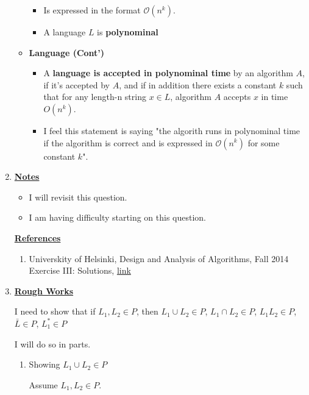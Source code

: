 \documentclass[12pt]{article}
\begin{document}
\begin{enumerate}[1.]
\begin{itemize}
        \begin{itemize}
            \item Is expressed in the format $\mathcal{O}(n^k)$.
            \item A language $L$ is \textbf{polynominal}
        \end{itemize}

        \item \textbf{Language (Cont')}

        \begin{itemize}
            \item A \textbf{language is accepted in polynominal time} by an algorithm $A$,
            if it's accepted by $A$, and if in addition there exists a constant $k$ such that
            for any length-n string $x \in L$, algorithm $A$ accepts $x$ in time $O(n^k)$.
            \item I feel this statement is saying "the algorith runs in polynominal time if the algorithm is correct and is expressed in $\mathcal{O}(n^k)$ for some constant $k$".
        \end{itemize}
    \end{itemize}

    \item

    \bigskip

    \underline{\textbf{Notes}}

    \begin{itemize}
        \item I will revisit this question.
        \item I am having difficulty starting on this question.
    \end{itemize}

    \underline{\textbf{References}}

    \begin{enumerate}[1)]
        \item Universkity of Helsinki, Design and Analysis of Algorithms, Fall 2014 Exercise III: Solutions, \href{https://www.cs.helsinki.fi/webfm_send/1461}{link}
    \end{enumerate}

    \item

    \underline{\textbf{Rough Works}}

    \bigskip

    I need to show that if $L_1,L_2 \in P$, then $L_1 \cup L_2 \in P$, $L_1 \cap L_2 \in P$,
    $L_1L_2 \in P$, $\bar{L} \in P$, $L_1^* \in P$

    \bigskip

    I will do so in parts.

    \bigskip

    \begin{enumerate}[1.]
        \item Showing $L_1 \cup L_2 \in P$

        \begin{mdframed}
        Assume $L_1,L_2 \in P$.

        \bigskip


        \end{mdframed}
    \end{enumerate}

\end{enumerate}
\end{document}
